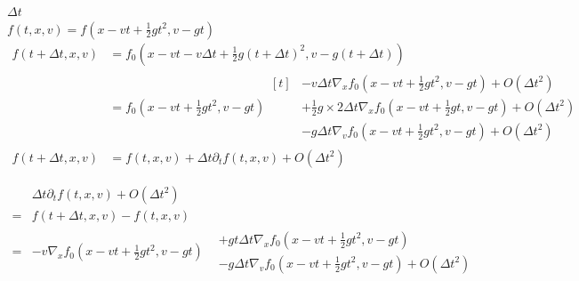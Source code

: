 \documentclass[12pt,a4paper]{article}
\begin{document}
\begin{enumerate}[label=\alph*)]
\begin{minipage}[t]{18cm}
\begin{minipage}[t]{12cm}
{		$\Delta t$ \\
		$f(t,x,v) = f(x-vt+\frac12 gt^2,v-gt)$\\
		$\begin{aligned}
			f(t+\Delta t, x,v) &= f_0(x-vt-v\Delta t + \frac 12 g(t+\Delta t)^2,v-g(t+\Delta t))\\
			&= f_0(x-vt+\frac12 gt^2,v-gt)\begin{aligned}[t]
				&-v\Delta t \nabla_x f_0(x-vt+\frac12 gt^2,v-gt)+O(\Delta t^2)\\
				&+\frac12 g\times 2\Delta t \nabla_x f_0(x-vt+\frac12 gt,v-gt)+O(\Delta t^2)\\
				&-g\Delta t \nabla_v f_0(x-vt+\frac 12 gt^2,v-gt) + O(\Delta t^2)
			\end{aligned}\\
			f(t+\Delta t,x,v)&=f(t,x,v)+\Delta t \partial_t f(t,x,v) + O(\Delta t^2)
		\end{aligned}$
		
		\vspace{.5cm}
		
		$\begin{aligned}
			&\Delta t \partial_t f(t,x,v) + O(\Delta t^2)\\
			=&f(t+\Delta t,x,v)-f(t,x,v) \\
			=&-v\nabla_x f_0 (x-vt+\frac12 gt^2,v-gt)\begin{aligned}
				&+gt\Delta t \nabla_x f_0(x-vt+\frac12gt^2,v-gt)\\
				&-g\Delta t \nabla_v f_0(x-vt+\frac12 gt^2,v-gt) + O(\Delta t^2)
			\end{aligned}
		\end{aligned}$
		}
	\end{minipage}
	\end{minipage}
	
	\hspace{1.7cm}\begin{minipage}[t]{15cm}
\end{minipage}
\end{enumerate}
\end{document}
